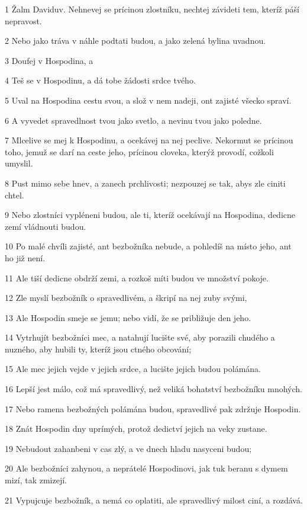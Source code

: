 \par 1 Žalm Daviduv. Nehnevej se prícinou zlostníku, nechtej závideti tem, kteríž páší nepravost.
\par 2 Nebo jako tráva v náhle podtati budou, a jako zelená bylina uvadnou.
\par 3 Doufej v Hospodina, a
\par 4 Teš se v Hospodinu, a dá tobe žádosti srdce tvého.
\par 5 Uval na Hospodina cestu svou, a slož v nem nadeji, ont zajisté všecko spraví.
\par 6 A vyvedet spravedlnost tvou jako svetlo, a nevinu tvou jako poledne.
\par 7 Mlcelive se mej k Hospodinu, a ocekávej na nej peclive. Nekormut se prícinou toho, jemuž se darí na ceste jeho, prícinou cloveka, kterýž provodí, cožkoli umyslil.
\par 8 Pust mimo sebe hnev, a zanech prchlivosti; nezpouzej se tak, abys zle ciniti chtel.
\par 9 Nebo zlostníci vypléneni budou, ale ti, kteríž ocekávají na Hospodina, dedicne zemí vládnouti budou.
\par 10 Po malé chvíli zajisté, ant bezbožníka nebude, a pohledíš na místo jeho, ant ho již není.
\par 11 Ale tiší dedicne obdrží zemi, a rozkoš míti budou ve množství pokoje.
\par 12 Zle myslí bezbožník o spravedlivém, a škripí na nej zuby svými,
\par 13 Ale Hospodin smeje se jemu; nebo vidí, že se približuje den jeho.
\par 14 Vytrhujít bezbožníci mec, a natahují lucište své, aby porazili chudého a nuzného, aby hubili ty, kteríž jsou ctného obcování;
\par 15 Ale mec jejich vejde v jejich srdce, a lucište jejich budou polámána.
\par 16 Lepší jest málo, což má spravedlivý, než veliká bohatství bezbožníku mnohých.
\par 17 Nebo ramena bezbožných polámána budou, spravedlivé pak zdržuje Hospodin.
\par 18 Znát Hospodin dny uprímých, protož dedictví jejich na veky zustane.
\par 19 Nebudout zahanbeni v cas zlý, a ve dnech hladu nasyceni budou;
\par 20 Ale bezbožníci zahynou, a neprátelé Hospodinovi, jak tuk beranu s dymem mizí, tak zmizejí.
\par 21 Vypujcuje bezbožník, a nemá co oplatiti, ale spravedlivý milost ciní, a rozdává.
